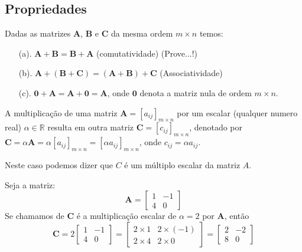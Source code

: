 \subsection*{Propriedades}
Dadas as matrizes $\textbf{A}$, $\textbf{B}$ e $\textbf{C}$ da mesma ordem $m\times n$ temos: 
\begin{itemize}
	\item[(a).] $\textbf{A}+\textbf{B}= \textbf{B}+\textbf{A}$ (comutatividade) (Prove...!)
	\item[(b).] $\textbf{A}+(\textbf{B}+\textbf{C})=(\textbf{A}+\textbf{B})+\textbf{C}$ (Associatividade)
	\item[(c).] $\textbf{0}+\textbf{A}=\textbf{A}+\textbf{0}=\textbf{A}$, onde $\textbf{0}$ denota a matriz nula de ordem $m \times n$. 
\end{itemize}
\begin{df}
	A multiplicação de uma matriz $\textbf{A}=[a_{ij}]_{m\times n}$ por um escalar (qualquer numero real) $\alpha \in \mathbb{R}$ resulta em outra matriz $\textbf{C}=[c_{ij}]_{m\times n}$, denotado por $\textbf{C}=\alpha \textbf{A}=\alpha[a_{ij}]_{m\times n}=[\alpha a_{ij}]_{m\times n}$, onde $c_{ij}=\alpha a_{ij}$. 
\end{df}
Neste caso podemos dizer que $C$ é um múltiplo escalar da matriz $A$.
\begin{ex}
	Seja a matriz:\\
	\begin{equation*}
	\textbf{A}=\begin{bmatrix}
	1   & -1\\
	4   & 0
	\end{bmatrix}  
	\end{equation*}
	Se chamamos de $\textbf{C}$ é a multiplicação escalar de $\alpha=2$ por $\textbf{A}$, então
	\begin{equation*}
	\textbf{C}=2\begin{bmatrix}
	1   & -1\\
	4   & 0
	\end{bmatrix} = \begin{bmatrix}
	2\times 1  & 2\times (-1) \\
	2\times 4  & 2\times 0
	\end{bmatrix}=\begin{bmatrix}
	2  & -2 \\
	8  & 0
	\end{bmatrix} 
	\end{equation*} 
	
\end{ex}
